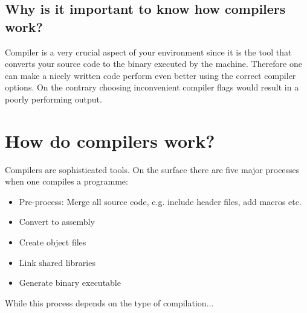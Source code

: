 \subsection{Why is it important to know how compilers work?}
Compiler is a very crucial aspect of your environment since it is the tool that converts
your source code to the binary executed by the machine. Therefore one can make a nicely 
written code perform even better using the correct compiler options. On the contrary 
choosing inconvenient compiler flags would result in a poorly performing output.

\section{How do compilers work?}
Compilers are sophisticated tools. On the surface there are five major processes when
one compiles a programme:
\begin{itemize}
  \item Pre-process: Merge all source code, e.g. include header files, add macros etc.
  \item Convert to assembly 
  \item Create object files
  \item Link shared libraries
  \item Generate binary executable
\end{itemize}
While this process depends on the type of compilation...

